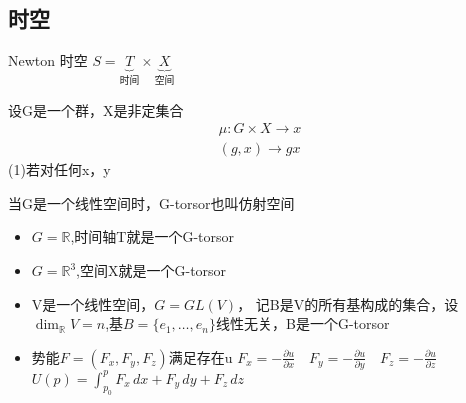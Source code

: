 \documentclass[12pt, a4paper, oneside, UTF8]{ctexbook}  %
\newcommand{\pa}{\partial}
\begin{document}
\subsection{时空}
\begin{defn}
Newton 时空 \(S=\underbrace{T}_{\text{时间}}\times
\underbrace{X}_{\text{空间}}\)

设G是一个群，X是非定集合
\begin{gather*}
    \mu: G\times X\rightarrow x\\
    (g,x)\rightarrow g x
\end{gather*}
(1)若对任何x，y


\end{defn}
\begin{corollary}
当G是一个线性空间时，G-torsor也叫仿射空间
\begin{itemize}
    \item $G=\mathbb{R}$,时间轴T就是一个G-torsor
    \item $G=\mathbb{R}^3$,空间X就是一个G-torsor
    \item V是一个线性空间，$G=GL(V)$，
    记B是V的所有基构成的集合，设$\dim_{\mathbb{R}}V=n$,基$B=\{e_1,\dots,e_n\}$线性无关，B是一个G-torsor
    \item 势能$F=(F_x,F_y,F_z)$满足存在u
    \(F_x=-\frac{\pa u}{\pa x}\quad F_y=-\frac{\pa u}{\pa y}\quad F_z=-\frac{\pa u}{\pa z}\)
    \(U(p)=\int_{p_0}^{p}F_x\,dx+F_y\,dy+F_z\,dz\)
\end{itemize}
\end{corollary}
\end{document}
